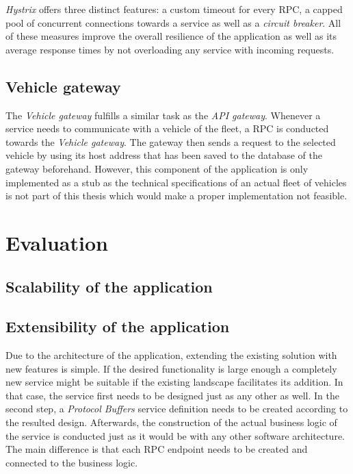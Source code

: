 \documentclass[12pt,a4paper,twoside]{report}
\begin{document}
\textit{Hystrix} offers three distinct features:
a custom timeout for every RPC, a capped pool of concurrent connections towards
a service as well as a \textit{circuit breaker}.
All of these measures improve the overall resilience of the application
as well as its average response times by not overloading any service with incoming
requests.


\section{Vehicle gateway}

The \textit{Vehicle gateway} fulfills a similar task as the \textit{API gateway}.
Whenever a service needs to communicate with a vehicle of the fleet, a RPC
is conducted towards the \textit{Vehicle gateway}. The gateway then sends a request
to the selected vehicle by using its host address that has been saved to the
database of the gateway beforehand.
However, this component of the application is only implemented as a stub
as the technical specifications of an actual fleet of vehicles is not part
of this thesis which would make a proper implementation not feasible.



\chapter{Evaluation} \label{chap:evaluation}

\section{Scalability of the application}




\section{Extensibility of the application}

Due to the architecture of the application, extending the existing solution
with new features is simple.
If the desired functionality is large enough a completely new service might
be suitable if the existing landscape facilitates its addition.
In that case, the service first needs to be designed just as any other as well.
In the second step, a \textit{Protocol Buffers} service definition needs to be
created according to the resulted design.
Afterwards, the construction of the actual business logic of the service is
conducted just as it would be with any other software architecture.
The main difference is that each RPC endpoint needs to be created and connected
to the business logic.
\end{document}
